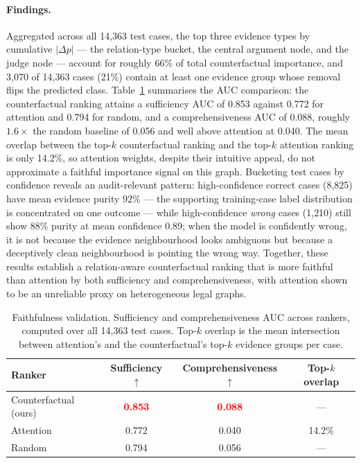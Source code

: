 \documentclass[runningheads]{llncs}
\newcommand{\best}[1]{\textbf{\textcolor{red}{#1}}}
\begin{document}
\paragraph{Findings.} Aggregated across all 14{,}363 test cases, the top three evidence types by cumulative $|\Delta p|$ --- the relation-type bucket, the central argument node, and the judge node --- account for roughly 66\% of total counterfactual importance, and 3{,}070 of 14{,}363 cases (21\%) contain at least one evidence group whose removal flips the predicted class. Table~\ref{tab:faithfulness} summarises the AUC comparison: the counterfactual ranking attains a sufficiency AUC of 0.853 against 0.772 for attention and 0.794 for random, and a comprehensiveness AUC of 0.088, roughly $1.6\times$ the random baseline of 0.056 and well above attention at 0.040. The mean overlap between the top-$k$ counterfactual ranking and the top-$k$ attention ranking is only 14.2\%, so attention weights, despite their intuitive appeal, do not approximate a faithful importance signal on this graph. Bucketing test cases by confidence reveals an audit-relevant pattern: high-confidence correct cases (8{,}825) have mean evidence purity 92\% --- the supporting training-case label distribution is concentrated on one outcome --- while high-confidence \emph{wrong} cases (1{,}210) still show 88\% purity at mean confidence 0.89; when the model is confidently wrong, it is not because the evidence neighbourhood looks ambiguous but because a deceptively clean neighbourhood is pointing the wrong way. Together, these results establish a relation-aware counterfactual ranking that is more faithful than attention by both sufficiency and comprehensiveness, with attention shown to be an unreliable proxy on heterogeneous legal graphs.

\begin{table}[!t]
\centering
\caption{Faithfulness validation. Sufficiency and comprehensiveness AUC across rankers, computed over all 14{,}363 test cases. Top-$k$ overlap is the mean intersection between attention's and the counterfactual's top-$k$ evidence groups per case.}
\label{tab:faithfulness}
\setlength{\tabcolsep}{8pt}
\renewcommand{\arraystretch}{1.15}
\small
\begin{tabular}{lccc}
\toprule
Ranker & Sufficiency $\uparrow$ & Comprehensiveness $\uparrow$ & Top-$k$ overlap \\
\midrule
Counterfactual (ours) & \best{0.853} & \best{0.088} & --- \\
Attention             & 0.772        & 0.040        & 14.2\% \\
Random                & 0.794        & 0.056        & --- \\
\bottomrule
\end{tabular}
\end{table}
\end{document}
